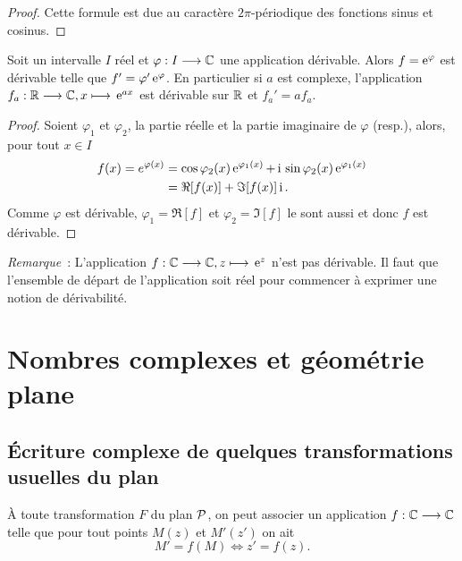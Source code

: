 \begin{proof}
  Cette formule est due au caractère \(2\pi\)-périodique des fonctions sinus
  et cosinus.
\end{proof}

\begin{prop}
  Soit un intervalle \(I\) réel et \(\fonctionR{\varphi}{I}{\C}\) une application
  dérivable. Alors \(f = \e^\varphi\) est dérivable telle que \(f' = \varphi'
  \e^\varphi\). En particulier si \(a\) est complexe, l'application
  \(\fonctionL{f_a}{\R}{\C}{x}{\e^{ax}}\) est dérivable sur \(\R\) et \(f_a' =
  af_a\).
\end{prop}

\begin{proof}
  Soient \(\varphi_1\) et \(\varphi_2\), la partie réelle et la partie
  imaginaire de \(\varphi\) (resp.), alors, pour tout \(x \in{}I\)
  \begin{align*}
    f(x) = e^{\varphi(x)}& = \cos \varphi_2(x) \e^{\varphi_1(x)}+ \ii{}\sin
    \varphi_2(x)\e^{\varphi_1(x)}\\
    & = \Re[f(x)] + \Im[f(x)]\ii.
  \end{align*}
  Comme \(\varphi\) est dérivable, \(\varphi_1 = \Re[f]\) et \(\varphi_2 =
  \Im[f]\) le sont aussi et donc \(f\) est dérivable.
\end{proof}

\emph{Remarque}~: L'application \(\fonctionL{f}{\C}{\C}{z}{\e^z}\) n'est pas
dérivable. Il faut que l'ensemble de départ de l'application soit réel pour
commencer à exprimer une notion de dérivabilité.

\section{Nombres complexes et géométrie plane}\label{sec:complexesetgeometrie}

\subsection{Écriture complexe de quelques transformations
usuelles du plan}\label{subsec:ecriturecomplexeettransformations}

À toute transformation \(F\) du plan \(\P\), on peut associer un application
\(\fonctionR{f}{\C}{\C}\) telle que pour tout points \(M(z)\) et \(M'(z')\) on
ait
\begin{equation}
  M' = f(M) \iff z' = f(z).
\end{equation}

